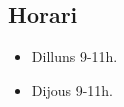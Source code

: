 \documentclass[../main.tex]{subfiles}
\begin{document}
\subsection*{Horari}
\begin{itemize}
    \item Dilluns 9-11h.
    \item Dijous 9-11h.
\end{itemize}
\end{document}
